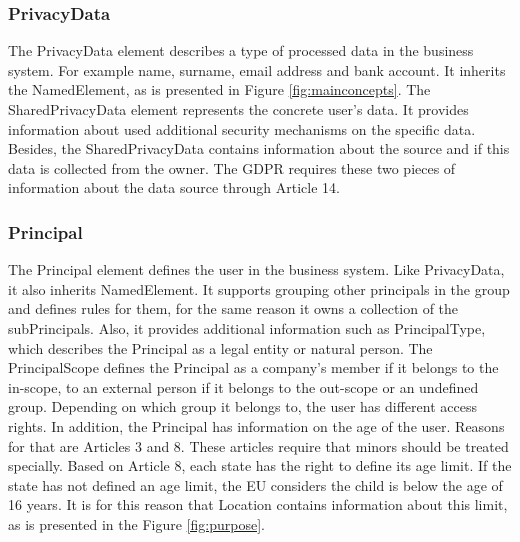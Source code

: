 \documentclass[11pt,english]{article}
\begin{document}
\subsubsection{PrivacyData}
The PrivacyData element describes a type of processed data in the business system. For example name, surname, email address and bank account. It inherits the NamedElement, as is presented in Figure \ref{fig:mainconcepts}. The SharedPrivacyData element represents the concrete user's data. It provides information about used additional security mechanisms on the specific data. Besides, the SharedPrivacyData contains information about the source and if this data is collected from the owner. The GDPR requires these two pieces of information about the data source through Article 14.
\subsubsection{Principal}
The Principal element defines the user in the business system. Like PrivacyData, it also inherits NamedElement. It supports grouping other principals in the group and defines rules for them, for the same reason it owns a collection of the subPrincipals. Also, it provides additional information such as PrincipalType, which describes the Principal as a legal entity or natural person. The PrincipalScope defines the Principal as a company's member if it belongs to the in-scope, to an external person if it belongs to the out-scope or an undefined group. Depending on which group it belongs to, the user has different access rights. In addition, the Principal has information on the age of the user. 
Reasons for that are Articles 3 and 8. These articles require that minors should be treated specially. Based on Article 8, each state has the right to define its age limit. If the state has not defined an age limit, the EU considers the child is below the age of 16 years. It is for this reason that Location contains information about this limit, as is presented in the Figure \ref{fig:purpose}.
\end{document}
